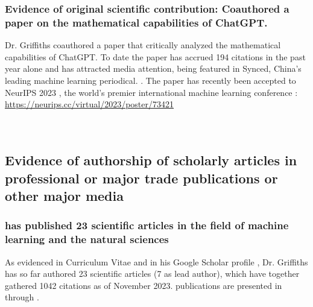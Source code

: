 \documentclass[11pt]{article}
\begin{document}
\subsubsection{Evidence of original scientific contribution: Coauthored a paper on the mathematical capabilities of ChatGPT.}
\label{chatgpt}


Dr. Griffiths coauthored a paper that critically analyzed the mathematical capabilities of ChatGPT. To date the paper has accrued 194 citations in the past year alone \cite{gscholar} and has attracted media attention, being featured in Synced, China’s leading machine learning periodical. \cite{media}. The paper has recently been accepted to NeurIPS 2023 \cite{neurips_papers}, the world's premier international machine learning conference \cite{gscholar}: \url{https://neurips.cc/virtual/2023/poster/73421} \\ 

 \\\\ \sk


\subsection{Evidence of authorship of scholarly articles in professional or major trade publications or other major media}
\label{authorship}

\subsubsection{\dr has published 23 scientific articles in the field  of machine learning and the natural sciences}

As evidenced in \drs Curriculum Vitae \cite{cv} and in his Google Scholar profile \cite{gscholar}, Dr. Griffiths has so far authored 23 scientific articles (7 as lead author), which have together gathered 1042 citations \cite{gscholar} as of November 2023. \drs publications are presented in \cite{conbo} through \cite{msci}.
\end{document}
